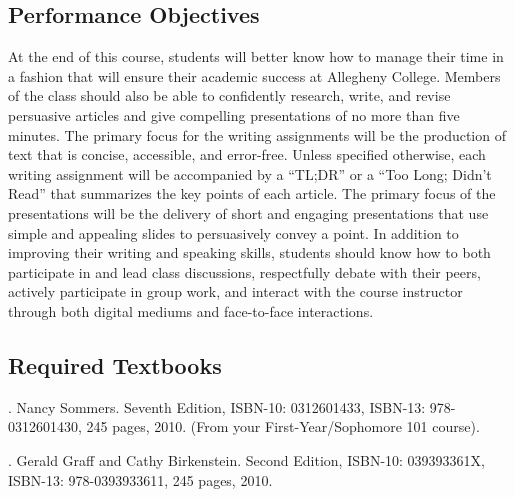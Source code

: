 \subsection*{Performance Objectives}

At the end of this course, students will better know how to manage their time in a fashion that will ensure their
academic success at Allegheny College. Members of the class should also be able to confidently research, write, and
revise persuasive articles and give compelling presentations of no more than five minutes. The primary focus for the
writing assignments will be the production of text that is concise, accessible, and error-free. Unless specified
otherwise, each writing assignment will be accompanied by a ``TL;DR'' or a ``Too Long; Didn't Read'' that summarizes the
key points of each article. The primary focus of the presentations will be the delivery of short and engaging
presentations that use simple and appealing slides to persuasively convey a point. In addition to improving their
writing and speaking skills, students should know how to both participate in and lead class discussions, respectfully
debate with their peers, actively participate in group work, and interact with the course instructor through both
digital mediums and face-to-face interactions.

\subsection*{Required Textbooks}


. Nancy Sommers. Seventh Edition, ISBN-10: 0312601433, ISBN-13: 978-0312601430,
245 pages, 2010. (From your First-Year/Sophomore 101 course).


. Gerald Graff and Cathy Birkenstein. Second Edition,
ISBN-10: 039393361X, ISBN-13: 978-0393933611, 245 pages, 2010.


